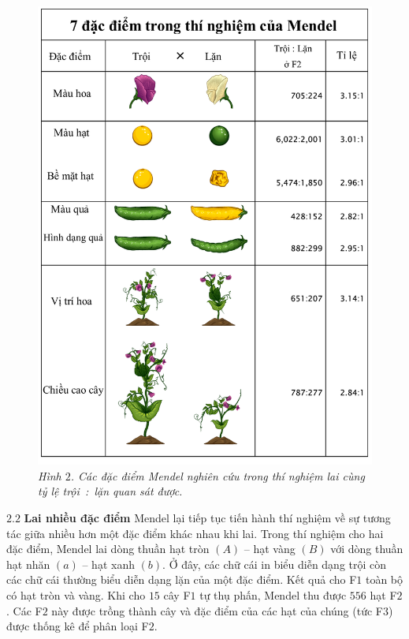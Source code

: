 \begin{multicols}{2}
\begin{figure}[H]
		\includegraphics[width=1\linewidth]{image003}
		\caption{\small\textit{\color{timhieukhoahoc}Hình $2$. Các đặc điểm Mendel nghiên cứu trong thí nghiệm lai cùng tỷ lệ trội~:~lặn quan sát được.}}
		\vspace*{-10pt}
	\end{figure}
	$\pmb{2.2}$ \textbf{\color{timhieukhoahoc}Lai nhiều đặc điểm}
	\vskip 0.1cm
	Mendel lại tiếp tục tiến hành thí nghiệm về sự tương tác giữa nhiều hơn một đặc điểm khác nhau khi lai. Trong thí nghiệm cho hai đặc điểm, Mendel lai dòng thuần hạt tròn $(A)$ -- hạt vàng $(B)$ với dòng thuần hạt nhăn $(a)$ -- hạt xanh $(b)$. Ở đây, các chữ cái in biểu diễn dạng trội còn các chữ cái thường biểu diễn dạng lặn của một đặc điểm. Kết quả cho F$1$ toàn bộ có hạt tròn và vàng. Khi cho $15$ cây F$1$ tự thụ phấn, Mendel thu được $556$ hạt F$2$. Các F$2$ này được trồng thành cây và đặc điểm của các hạt của chúng (tức F$3$) được thống kê để phân loại F$2$.
	\begin{table}[H]

\end{table}
\end{multicols}
